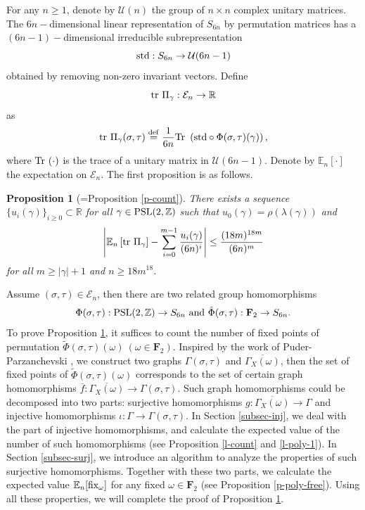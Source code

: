 \documentclass{amsart}
\newcommand{\R}{\mathbb{R}}
\theoremstyle{plain}
\newtheorem{proposition}[theorem]{Proposition}
\theoremstyle{definition}
\theoremstyle{remark}
\begin{document}
\noindent For any $n\geq 1$, denote by $\mathcal{U}(n)$ the group of $n\times n$ complex unitary matrices. The $6n-$dimensional linear representation of $S_{6n}$ by permutation matrices has a $(6n-1)-$dimensional irreducible subrepresentation 
    $$\textnormal{std}:S_{6n}\to\mathcal{U}(6n-1)$$
    obtained by removing non-zero invariant vectors. Define
    \[\textnormal{tr }\Pi_\gamma:\mathcal{E}_n\to\mathbb{R}\]
    as
    \[\textnormal{tr }\Pi_\gamma(\sigma,\tau)\overset{\mathrm{def}}{=}\frac{1}{6n}\textnormal{Tr }\left(\textnormal{std}\circ\Phi(\sigma,\tau)(\gamma)\right),\]
    where $\textnormal{Tr }(\cdot)$ is the trace of a unitary matrix in $\mathcal{U}(6n-1)$. Denote by $\mathbb{E}_n\left[\cdot\right]$ the expectation on $\mathcal{E}_n$. The first proposition is as follows. 
    \begin{proposition}[=Proposition \ref{p-count}]\label{i-p-count}
    There exists a sequence $\{u_i(\gamma)\}_{i\geq 0} \subset \R$ for all $\gamma\in\textnormal{PSL}(2,\mathbb{Z})$ such that $u_0(\gamma)=\rho(\lambda(\gamma))$ and $$\left|\mathbb{E}_n\left[\textnormal{tr }\Pi_\gamma\right]-\sum\limits_{i=0}^{m-1}\frac{u_i(\gamma)}{(6n)^i}\right|\leq\frac{(18m)^{18m}}{(6n)^m}$$
    for all $m\geq |\gamma|+1$ and $n\geq 18m^{18}$.
    \end{proposition}
\noindent Assume $(\sigma,\tau)\in\mathcal{E}_n$, then there are two related group homomorphisms
$$\Phi(\sigma,\tau):\textnormal{PSL}(2,\mathbb{Z})\to S_{6n}\text{ and }\tilde{\Phi}(\sigma,\tau):\textbf{F}_2\to S_{6n}.$$
To prove Proposition \ref{i-p-count}, it suffices to count the number of fixed points of permutation $\tilde{\Phi}(\sigma,\tau)(\omega)\ (\omega\in\textbf{F}_2)$. Inspired by the work of Puder-Parzanchevski \cite{PP15}, we construct two graphs $\Gamma(\sigma,\tau)$ and $\overline{\Gamma_X(\omega)}$, then the set of fixed points of $\tilde{\Phi}(\sigma,\tau)(\omega)$ corresponds to the set of certain graph homomorphisms $\overline{f}:\overline{\Gamma_X(\omega)}\to\Gamma(\sigma,\tau)$. Such graph homomorphisms could be decomposed into two parts: surjective homomorphisms $g:\overline{\Gamma_X(\omega)}\to \Gamma$ and injective homomorphisms $\iota:\Gamma\to\Gamma(\sigma,\tau)$. In Section \ref{subsec-inj}, we deal with the part of injective homomorphisms, and calculate the expected value of the number of such homomorphisms (see Proposition \ref{l-count} and \ref{l-poly-1}). In Section \ref{subsec-surj}, we introduce an algorithm to analyze the properties of such surjective homomorphisms. Together with these two parts, we calculate the expected value $\mathbb{E}_n[\textnormal{fix}_\omega]$ for any fixed $\omega\in\textbf{F}_2$ (see Proposition \ref{p-poly-free}). Using all these properties, we will complete the proof of Proposition \ref{i-p-count}.    
\end{document}
